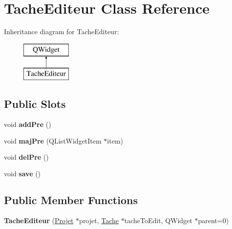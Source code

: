 \hypertarget{class_tache_editeur}{}\section{Tache\+Editeur Class Reference}
\label{class_tache_editeur}
Inheritance diagram for Tache\+Editeur\+:\begin{figure}[H]
\begin{center}
\leavevmode
\includegraphics[height=2.000000cm]{class_tache_editeur}
\end{center}
\end{figure}
\subsection*{Public Slots}
\begin{DoxyCompactItemize}
\item 
\hypertarget{class_tache_editeur_ac374518812b38172268fb6c4f9435be4}{}void {\bfseries add\+Pre} ()\label{class_tache_editeur_ac374518812b38172268fb6c4f9435be4}

\item 
\hypertarget{class_tache_editeur_a295436aa5f7a19c5f5172954a3efd439}{}void {\bfseries maj\+Pre} (Q\+List\+Widget\+Item $\ast$item)\label{class_tache_editeur_a295436aa5f7a19c5f5172954a3efd439}

\item 
\hypertarget{class_tache_editeur_a0a50f25d4cbf1c582c17d282bcb182f6}{}void {\bfseries del\+Pre} ()\label{class_tache_editeur_a0a50f25d4cbf1c582c17d282bcb182f6}

\item 
\hypertarget{class_tache_editeur_a4bb89bf9c4a7422ff40291b8226aca09}{}void {\bfseries save} ()\label{class_tache_editeur_a4bb89bf9c4a7422ff40291b8226aca09}

\end{DoxyCompactItemize}
\subsection*{Public Member Functions}
\begin{DoxyCompactItemize}
\item 
\hypertarget{class_tache_editeur_ab5ebf43cf7d43148e6dd270b072ab0c6}{}{\bfseries Tache\+Editeur} (\hyperlink{class_projet}{Projet} $\ast$projet, \hyperlink{class_tache}{Tache} $\ast$tache\+To\+Edit, Q\+Widget $\ast$parent=0)\label{class_tache_editeur_ab5ebf43cf7d43148e6dd270b072ab0c6}

\end{DoxyCompactItemize}



